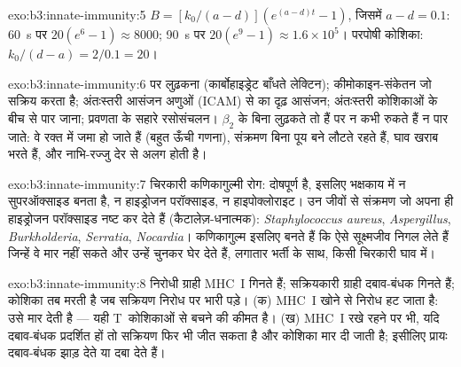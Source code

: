 \begin{solution}{exo:b3:innate-immunity:5}
$B = [k_{0}/(a-d)](e^{(a-d)t} - 1)$, जिसमें $a - d = 0.1$: \qty{60}{s} पर
$20(e^{6} - 1) \approx 8000$; \qty{90}{s} पर $20(e^{9} - 1) \approx
1.6\times 10^{5}$। परपोषी कोशिका: $k_{0}/(d - a) = 2/0.1 = 20$।
\end{solution}

\begin{solution}{exo:b3:innate-immunity:6}
 पर लुढ़कना (कार्बोहाइड्रेट बाँधते लेक्टिन); कीमोकाइन-संकेतन
जो  सक्रिय करता है; अंतःस्तरी आसंजन अणुओं (ICAM) से
 का दृढ़ आसंजन; अंतःस्तरी कोशिकाओं के बीच से पार जाना;
प्रवणता के सहारे रसोसंचलन। $\beta_{2}$  के बिना 
लुढ़कते तो हैं पर न कभी रुकते हैं न पार जाते: वे रक्त में जमा हो जाते
हैं (बहुत ऊँची गणना), संक्रमण बिना पूय बने लौटते रहते हैं, घाव खराब
भरते हैं, और नाभि-रज्जु देर से अलग होती है।
\end{solution}

\begin{solution}{exo:b3:innate-immunity:7}
चिरकारी कणिकागुल्मी रोग:  दोषपूर्ण है, इसलिए भक्षकाय में
न सुपरऑक्साइड बनता है, न हाइड्रोजन परॉक्साइड, न हाइपोक्लोराइट। उन जीवों
से संक्रमण जो अपना ही हाइड्रोजन परॉक्साइड नष्ट कर देते हैं
(कैटालेज़-धनात्मक): \emph{Staphylococcus aureus}, \emph{Aspergillus},
\emph{Burkholderia}, \emph{Serratia}, \emph{Nocardia}। कणिकागुल्म
इसलिए बनते हैं कि  ऐसे सूक्ष्मजीव निगल लेते हैं जिन्हें वे मार
नहीं सकते और उन्हें चुनकर घेर देते हैं, लगातार भर्ती के साथ, किसी
चिरकारी घाव में।
\end{solution}

\begin{solution}{exo:b3:innate-immunity:8}
निरोधी ग्राही MHC~I गिनते हैं; सक्रियकारी ग्राही दबाव-बंधक गिनते हैं;
कोशिका तब मरती है जब सक्रियण निरोध पर भारी पड़े। (क) MHC~I खोने से
निरोध हट जाता है:  उसे मार देती है --- यही
T~कोशिकाओं से बचने की कीमत है। (ख) MHC~I रखे रहने पर भी, यदि दबाव-बंधक
प्रदर्शित हों तो सक्रियण फिर भी जीत सकता है और कोशिका मार दी जाती है;
इसीलिए  प्रायः दबाव-बंधक झाड़ देते या दबा देते हैं।
\end{solution}

